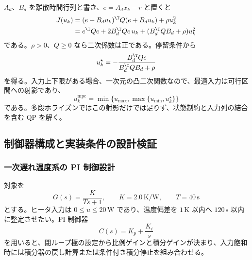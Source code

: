 \begin{derivation}
$A_d$、$B_d$ を離散時間行列と書き、$e=A_dx_k-r$ と置くと
\begin{align}
  J(u_k)
  &=(e+B_du_k)^\T Q(e+B_du_k)+\rho u_k^2\\
  &=e^\T Qe+2B_d^\T Qe\,u_k
    +(B_d^\T QB_d+\rho)u_k^2
\end{align}
である。$\rho>0$、$Q\ge0$ なら二次係数は正である。停留条件から
\begin{equation}
  u_k^\star
  =
  -\frac{B_d^\T Qe}{B_d^\T QB_d+\rho}
\end{equation}
を得る。入力上下限がある場合、一次元の凸二次関数なので、最適入力は可行区間への射影であり、
\begin{equation}
  u_k^{\mathrm{mpc}}
  =
  \min\{u_{\max},\max\{u_{\min},u_k^\star\}\}
\end{equation}
である。多段ホライズンではこの射影だけでは足りず、状態制約と入力列の結合を含む QP を解く。
\end{derivation}

\subsection{制御器構成と実装条件の設計検証}

\subsubsection{一次遅れ温度系の PI 制御設計}

対象を
\begin{equation}
  G(s)=\frac{K}{Ts+1},
  \qquad K=2.0\,\mathrm{K/W},
  \qquad T=40\,\mathrm{s}
\end{equation}
とする。ヒータ入力は $0\le u\le 20\,\mathrm{W}$ であり、温度偏差を $1\,\mathrm{K}$ 以内へ $120\,\mathrm{s}$ 以内に整定させたい。PI 制御器
\begin{equation}
  C(s)=K_p+\frac{K_i}{s}
\end{equation}
を用いると、閉ループ極の設定から比例ゲインと積分ゲインが決まり、入力飽和時には積分器の戻し計算または条件付き積分停止を組み合わせる。

